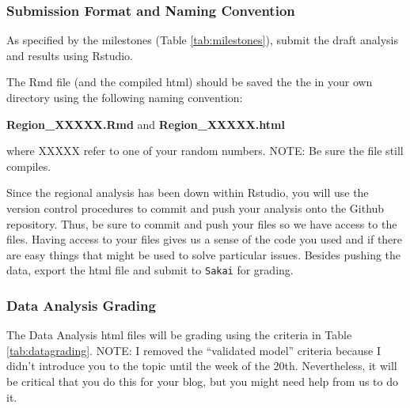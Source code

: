   


\subsubsection{Submission Format and Naming Convention}

As specified by the milestones (Table \ref{tab:milestones}), submit the draft analysis and results using Rstudio. 

The Rmd file (and the compiled html) should be saved the the in your own directory using the following naming convention:

\begin{center}
\textbf{Region\_XXXXX.Rmd} and \textbf{Region\_XXXXX.html}
\end{center}

\medskip \noindent where XXXXX refer to one of your random numbers. NOTE: Be sure the file still compiles.

Since the regional analysis has been down within Rstudio, you will use the version control procedures to commit and push your analysis onto the Github repository. Thus, be sure to commit and push your files so we have access to the files. {\color{red} Having access to your files gives us a sense of the code you used and if there are easy things that might be used to solve particular issues. Besides pushing the data, export the html file and submit to \texttt{Sakai} for grading.} 

\subsubsection{Data Analysis Grading}

The Data Analysis html files will be grading using the criteria in Table \ref{tab:datagrading}. {\color{red}NOTE: I removed the ``validated model'' criteria because I didn't introduce you to the topic until the week of the 20th. Nevertheless, it will be critical that you do this for your blog, but you might need help from us to do it.}

